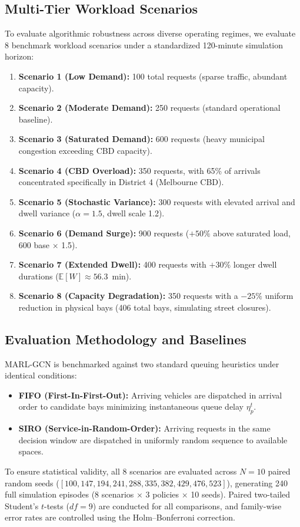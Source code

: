 \documentclass[journal]{IEEEtran}
\begin{document}
\subsection{Multi-Tier Workload Scenarios}
To evaluate algorithmic robustness across diverse operating regimes, we evaluate 8 benchmark workload scenarios under a standardized 120-minute simulation horizon:
\begin{enumerate}
    \item \textbf{Scenario 1 (Low Demand):} 100 total requests (sparse traffic, abundant capacity).
    \item \textbf{Scenario 2 (Moderate Demand):} 250 requests (standard operational baseline).
    \item \textbf{Scenario 3 (Saturated Demand):} 600 requests (heavy municipal congestion exceeding CBD capacity).
    \item \textbf{Scenario 4 (CBD Overload):} 350 requests, with 65\% of arrivals concentrated specifically in District 4 (Melbourne CBD).
    \item \textbf{Scenario 5 (Stochastic Variance):} 300 requests with elevated arrival and dwell variance ($\alpha = 1.5$, dwell scale 1.2).
    \item \textbf{Scenario 6 (Demand Surge):} 900 requests ($+50\%$ above saturated load, 600 base $\times$ 1.5).
    \item \textbf{Scenario 7 (Extended Dwell):} 400 requests with $+30\%$ longer dwell durations ($\mathbb{E}[W] \approx 56.3$~min).
    \item \textbf{Scenario 8 (Capacity Degradation):} 350 requests with a $-25\%$ uniform reduction in physical bays (406 total bays, simulating street closures).
\end{enumerate}

\subsection{Evaluation Methodology and Baselines}
MARL-GCN is benchmarked against two standard queuing heuristics under identical conditions:
\begin{itemize}
    \item \textbf{FIFO (First-In-First-Out):} Arriving vehicles are dispatched in arrival order to candidate bays minimizing instantaneous queue delay $\eta_p^t$.
    \item \textbf{SIRO (Service-in-Random-Order):} Arriving requests in the same decision window are dispatched in uniformly random sequence to available spaces.
\end{itemize}
To ensure statistical validity, all 8 scenarios are evaluated across $N=10$ paired random seeds ($[100, 147, 194, 241, 288, 335, 382, 429, 476, 523]$), generating 240 full simulation episodes (8 scenarios $\times$ 3 policies $\times$ 10 seeds). Paired two-tailed Student's $t$-tests ($df=9$) are conducted for all comparisons, and family-wise error rates are controlled using the Holm--Bonferroni correction.
\end{document}
